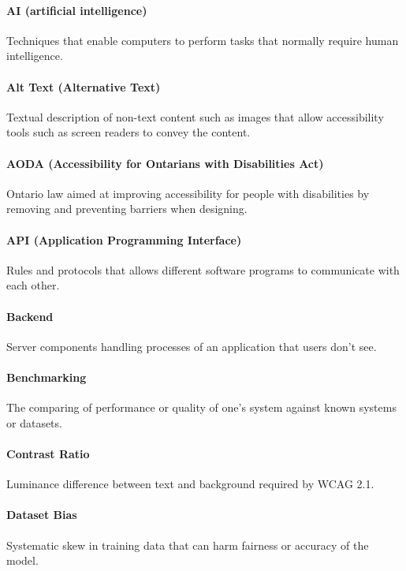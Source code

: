 \documentclass[12pt, titlepage]{article}
\begin{document}
\paragraph*{AI (artificial intelligence)}
Techniques that enable computers to perform tasks that normally
require human intelligence.

\paragraph*{Alt Text (Alternative Text)}
Textual description of non-text content such as images that allow
accessibility tools such as screen readers to convey the content.

\paragraph*{AODA (Accessibility for Ontarians with Disabilities Act)}
Ontario law aimed at improving accessibility for people with
disabilities by removing and preventing barriers when designing.

\paragraph*{API (Application Programming Interface)}
Rules and protocols that allows different software programs to
communicate with each other.

\paragraph*{Backend}
Server components handling processes of an application that users don't see.

\paragraph*{Benchmarking}
The comparing of performance or quality of one's system against known
systems or datasets.

\paragraph*{Contrast Ratio}
Luminance difference between text and background required by WCAG 2.1.

\paragraph*{Dataset Bias}
Systematic skew in training data that can harm fairness or accuracy
of the model.
\end{document}
